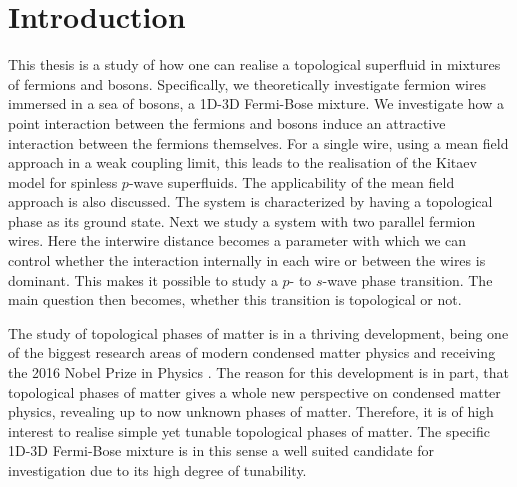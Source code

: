 
\chapter{Introduction} %

\label{Chapter1} %



This thesis is a study of how one can realise a topological superfluid in mixtures of fermions and bosons. Specifically, we theoretically investigate fermion wires immersed in a sea of bosons, a 1D-3D Fermi-Bose mixture. We investigate how a point interaction between the fermions and bosons induce an attractive interaction between the fermions themselves. For a single wire, using a mean field approach in a weak coupling limit, this leads to the realisation of the Kitaev model for spinless $p$-wave superfluids. The applicability of the mean field approach is also discussed. The system is characterized by having a topological phase as its ground state. Next we study a system with two parallel fermion wires. Here the interwire distance becomes a parameter with which we can control whether the interaction internally in each wire or between the wires is dominant. This makes it possible to study a $p$- to $s$-wave phase transition. The main question then becomes, whether this transition is topological or not. 

The study of topological phases of matter is in a thriving development, being one of the biggest research areas of modern condensed matter physics and receiving the 2016 Nobel Prize in Physics \cite{NobelPrize2016}. The reason for this development is in part, that topological phases of matter gives a whole new perspective on condensed matter physics, revealing up to now unknown phases of matter. Therefore, it is of high interest to realise simple yet tunable topological phases of matter. The specific 1D-3D Fermi-Bose mixture is in this sense a well suited candidate for investigation due to its high degree of tunability. 

